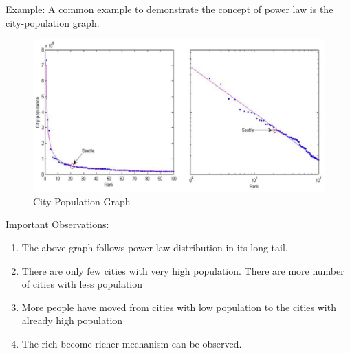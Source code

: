 Example:
A common example to demonstrate the concept of power law is the city-population graph.
\begin{figure}
\centering
\includegraphics[scale=0.6]{Chapter1/PLgraph.eps}
\caption{City Population Graph}
\end{figure}

Important Observations:
\begin{enumerate}
\item The above graph follows power law distribution in its long-tail.
\item There are only few cities with very high population. There are more number of cities with less population
\item More people have moved from cities with low population to the cities with already high population
\item The rich-become-richer mechanism can be observed.
\end{enumerate}




